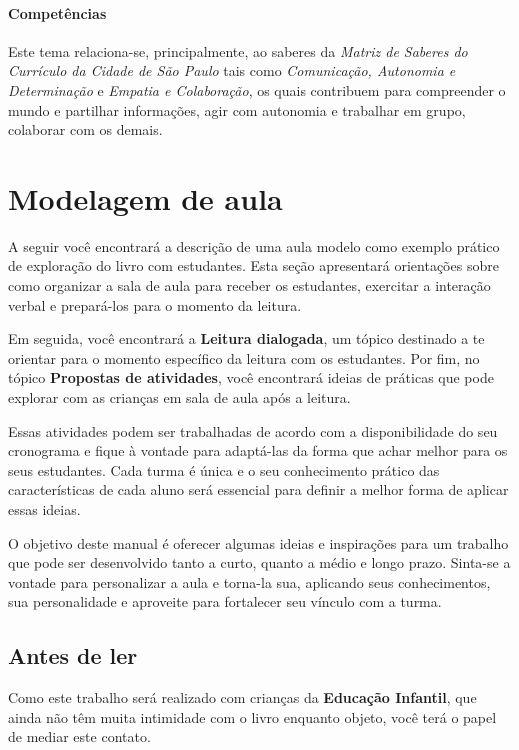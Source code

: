 \documentclass[11pt]{extarticle}
\begin{document}
\paragraph{Competências} 
Este tema relaciona-se, principalmente, ao saberes da \textit{Matriz de Saberes do Currículo da Cidade de São Paulo} tais como \textit{Comunicação, Autonomia e Determinação} e \textit{Empatia e Colaboração}, os quais contribuem para compreender o mundo e partilhar informações, agir com autonomia e trabalhar em grupo, colaborar com os demais.

\section{Modelagem de aula}
A seguir você encontrará a descrição de uma aula modelo como exemplo 
prático de exploração do livro com estudantes. Esta seção apresentará 
orientações sobre como organizar a sala de aula para receber os 
estudantes, exercitar a interação verbal e prepará-los para o 
momento da leitura.

Em seguida, você encontrará a \textbf{Leitura dialogada}, um 
tópico destinado a te orientar para o momento específico da 
leitura com os estudantes. Por fim, no tópico 
\textbf{Propostas de atividades}, você encontrará ideias 
de práticas que pode explorar com as crianças em sala de 
aula após a leitura. 

Essas atividades podem ser trabalhadas de acordo com a 
disponibilidade do seu cronograma e fique à vontade para adaptá-las 
da forma que achar melhor para os seus estudantes. Cada turma é única 
e o seu conhecimento prático das características de cada aluno será 
essencial para definir a melhor forma de aplicar essas ideias. 

O objetivo deste manual é oferecer algumas ideias 
e inspirações para um trabalho que pode ser desenvolvido tanto 
a curto, quanto a médio e longo prazo. Sinta-se a vontade para 
personalizar a aula e torna-la sua, aplicando seus conhecimentos, sua 
personalidade e aproveite para fortalecer 
seu vínculo com a turma.


\subsection{Antes de ler}


Como este trabalho será realizado com crianças da \textbf{Educação Infantil}, 
que ainda não têm muita intimidade com o livro enquanto objeto, você terá o 
papel de mediar este contato. 
\end{document}
